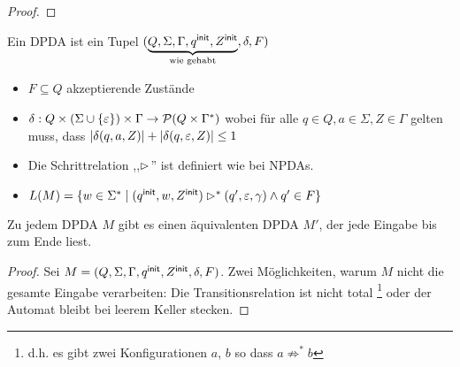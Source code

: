 {\begin{proof}
\end{proof}

\begin{Def}[name={[DPDA]}]
        Ein \ac{DPDA} ist ein Tupel $(\underbrace{Q,\Sigma,\Gamma,q^\mathsf{init},Z^\mathsf{init}}_{\text{wie gehabt}},\delta,F)$
        \vspace{-1em}
        \begin{itemize}
        \item $F\subseteq Q$ akzeptierende Zustände
        \item $\delta: Q\x (\Sigma\cup\{\Eps\})\x \Gamma \-> \mathcal{P}(Q\x \Gamma^*)$ wobei für alle $q\in Q,a\in\Sigma,Z\in\Gamma$ gelten muss, dass
        $|\delta(q,a,Z)| + |\delta(q,\varepsilon,Z)| \leq 1$
        \item Die Schrittrelation ,,$\rhd$'' ist definiert wie bei NPDAs.
        \item $L(M) = \{w\in\Sigma^* \mid (q^\mathsf{init},w,Z^\mathsf{init}) \rhd^* (q',\varepsilon,\gamma) \land q'\in F \}$ \qedhere
        \end{itemize}
\end{Def}

\begin{lemma}[name={[\acs*{DPDA}, der gesamte Eingabe verarbeitet]}]
        \label{lem:DPDA ges. Eingabe}
        Zu jedem \ac{DPDA} $M$ gibt es einen äquivalenten \ac{DPDA} $M'$, der
        jede Eingabe bis zum Ende liest.
\end{lemma}
\begin{proof}

  Sei $M = (Q, \Sigma, \Gamma, q^\mathsf{init}, Z^\mathsf{init}, \delta, F)$. 
  Zwei Möglichkeiten, warum $M$ nicht die gesamte Eingabe verarbeiten:
  Die Transitionsrelation ist nicht total \footnote{d.h. es gibt zwei Konfigurationen $a$, $b$
  so dass $a \not \Rightarrow^* b$} oder der Automat bleibt bei
  leerem Keller stecken.


\end{proof}}
